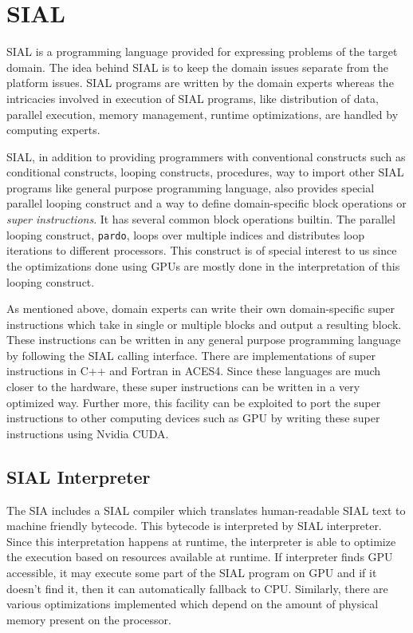 \section{SIAL}
SIAL is a programming language provided for expressing problems of the target
domain. The idea behind SIAL is to keep the domain issues separate from
the platform issues. SIAL programs are written by the domain experts
whereas the intricacies involved in execution of SIAL programs, like distribution of
data, parallel execution, memory management, runtime optimizations, are handled
by computing experts.

SIAL, in addition to providing programmers with conventional constructs such as
conditional constructs, looping constructs, procedures, way to import other SIAL
programs like general purpose programming language, also provides special parallel looping construct and a way
to define domain-specific block operations or \textit{super instructions}. It
has several common block operations builtin. The
parallel looping construct, \texttt{pardo}, loops over multiple indices and
distributes loop iterations to different processors. This construct is of special
interest to us since the optimizations done using GPUs are mostly done in the
interpretation of this looping construct.

As mentioned above, domain experts can write their own domain-specific
super instructions which take in single or multiple blocks and output a resulting block. These
instructions can be written in any general purpose programming language by following
the SIAL calling interface. There are implementations of super instructions in
C++ and Fortran in ACES4. Since these languages are much
closer to the hardware, these super instructions can be written in a very
optimized way. Further more, this facility can be exploited to port the super instructions to
other computing devices such as GPU by writing these super instructions using
Nvidia CUDA.

\subsection{SIAL Interpreter}
The SIA includes a SIAL compiler which translates human-readable SIAL text to
machine friendly bytecode. This bytecode is interpreted by SIAL interpreter.
Since this interpretation happens at runtime, the interpreter is able to optimize the
execution based on resources available at runtime. If interpreter finds GPU
accessible, it may execute some part of the SIAL program on GPU and if it
doesn't find it, then it can automatically fallback to CPU. Similarly, there are
various optimizations implemented which depend on the amount of physical memory
present on the processor.

